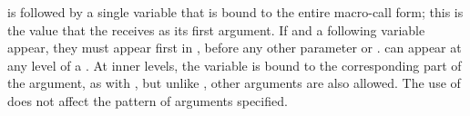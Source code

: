 is followed by a single variable that is bound to the
entire macro-call form; this is the value that the 
receives as its first argument.
If  and a following variable appear,
they must appear first in ,
before any other parameter or .
 can appear at any level of a . 
At inner levels, the  variable is bound to
		the corresponding part of the argument, 
as with , but unlike , other arguments are also allowed.
The use of  does not affect the pattern of arguments
     specified.


